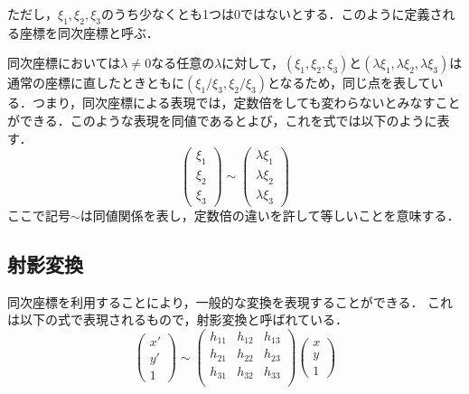 \documentclass[summary]{nitocs}
\numberwithin{equation}{section}
\begin{document}
            ただし，$\xi_1,\xi_2,\xi_3$のうち少なくとも1つは0ではないとする．このように定義される座標を同次座標と呼ぶ\cite{DIP}．

            同次座標においては$\lambda\neq0$なる任意の$\lambda$に対して，$(\xi_1,\xi_2,\xi_3)$と$(\lambda\xi_1,\lambda\xi_2,\lambda\xi_3)$は通常の座標に直したときともに$(\xi_1/\xi_3,\xi_2/\xi_3)$となるため，同じ点を表している．つまり，同次座標による表現では，定数倍をしても変わらないとみなすことができる．このような表現を同値であるとよび，これを式では以下のように表す．
            \begin{equation} %
                \left(
                    \begin{array}{ccc}
                        \xi_1\\
                        \xi_2\\
                        \xi_3
                    \end{array}
                \right) \sim %
                \left(
                    \begin{array}{ccc}
                        \lambda\xi_1\\
                        \lambda\xi_2\\
                        \lambda\xi_3
                    \end{array}
                \right)
            \end{equation}
            ここで記号$\sim$は同値関係を表し，定数倍の違いを許して等しいことを意味する．

        \subsection{射影変換}
            同次座標を利用することにより，一般的な変換を表現することができる．
            これは以下の式で表現されるもので，射影変換と呼ばれている\cite{DIP}．
            \begin{equation} %
                \left(
                    \begin{array}{ccc}
                    x'\\
                    y'\\
                    1
                    \end{array}
                \right)\sim
                \left(
                    \begin{array}{ccc}
                    h_{11} & h_{12} & h_{13}\\
                    h_{21} & h_{22} & h_{23}\\
                    h_{31} & h_{32} & h_{33}\\
                    \end{array}
                \right)
                \left(
                    \begin{array}{ccc}
                    x\\
                    y\\
                    1
                    \end{array}
                \right)
                \label{Homography}
            \end{equation}
\end{document}

